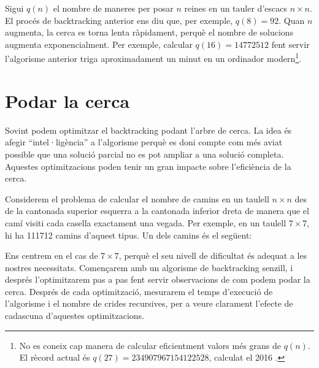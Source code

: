 Sigui $q(n)$ el nombre de maneres
per posar $n$ reines en un tauler d'escacs $n \times n$.
El procés de backtracking anterior
ens diu que, per exemple, $q(8)=92$.
Quan $n$ augmenta, la cerca es torna lenta ràpidament,
perquè el nombre de solucions augmenta
exponencialment.
Per exemple, calcular $q(16)=14772512$
fent servir l'algorisme anterior triga aproximadament un minut
en un ordinador modern\footnote{No es coneix cap manera de calcular
eficientment valors més grans de $q(n)$. El rècord actual és
$q(27)=234907967154122528$, calculat el 2016 \cite{q27}.}.

\section{Podar la cerca}

Sovint podem optimitzar el backtracking
podant l'arbre de cerca.
La idea és afegir ``intel·ligència'' a l'algorisme
perquè es doni compte com més aviat possible que una
solució parcial no es pot ampliar
a una solució completa.
Aquestes optimitzacions poden tenir un gran impacte
sobre l'eficiència de la cerca.

Considerem el problema
de calcular el nombre de camins
en un taulell $n \times n$ des de la cantonada superior esquerra
a la cantonada inferior dreta de manera que
el camí visiti cada casella exactament una vegada.
Per exemple, en un taulell $7 \times 7$,
hi ha 111712 camins d'aquest tipus.
Un dels camins és el següent:

\begin{center}
\end{center}

Ens centrem en el cas de $7 \times 7$,
perquè el seu nivell de dificultat és adequat a les nostres necessitats.
Començarem amb un algorisme de backtracking senzill,
i després l'optimitzarem pas a pas fent servir observacions
de com podem podar la cerca.
Després de cada optimització, mesurarem el temps d'execució
de l'algorisme i el nombre de crides recursives,
per a veure clarament l'efecte de cadascuna d'aquestes
optimitzacions.

